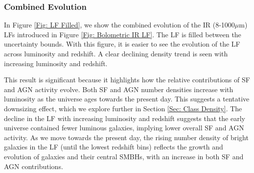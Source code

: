 \subsubsection{Combined Evolution}
In Figure \ref{Fig: LF Filled}, we show the combined evolution of the IR (8-1000$\mu$m) LFs introduced in Figure \ref{Fig: Bolometric IR LF}. The LF is filled between the uncertainty bounds. With this figure, it is easier to see the evolution of the LF across luminosity and redshift. A clear declining density trend is seen with increasing luminosity and redshift.

This result is significant because it highlights how the relative contributions of SF and AGN activity evolve. Both SF and AGN number densities increase with luminosity as the universe ages towards the present day. This suggests a tentative downsizing effect, which we explore further in Section \ref{Sec: Class Density}. The decline in the LF with increasing luminosity and redshift suggests that the early universe contained fewer luminous galaxies, implying lower overall SF and AGN activity. As we move towards the present day, the rising number density of bright galaxies in the LF (until the lowest redshift bins) reflects the growth and evolution of galaxies and their central SMBHs, with an increase in both SF and AGN contributions.